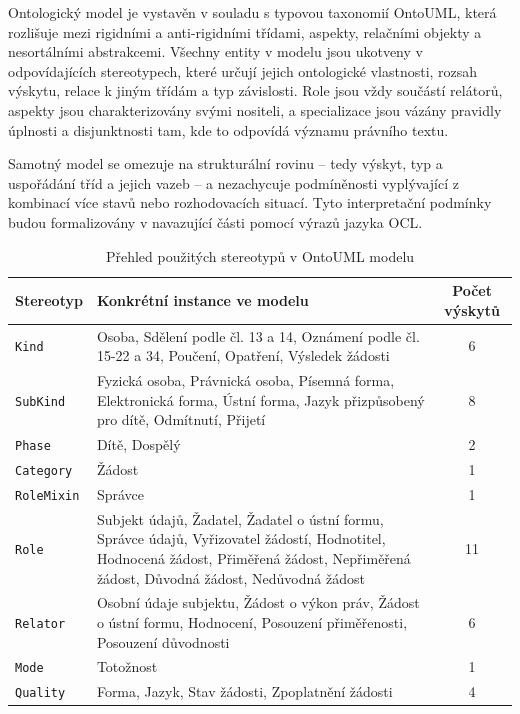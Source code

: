 \noindent Ontologický model je vystavěn v souladu s typovou taxonomií OntoUML, která rozlišuje mezi rigidními a anti-rigidními třídami, aspekty, relačními objekty a nesortálními abstrakcemi. Všechny entity v modelu jsou ukotveny v odpovídajících stereotypech, které určují jejich ontologické vlastnosti, rozsah výskytu, relace k jiným třídám a typ závislosti. Role jsou vždy součástí relátorů, aspekty jsou charakterizovány svými nositeli, a specializace jsou vázány pravidly úplnosti a disjunktnosti tam, kde to odpovídá významu právního textu.

Samotný model se omezuje na strukturální rovinu – tedy výskyt, typ a uspořádání tříd a jejich vazeb – a nezachycuje podmíněnosti vyplývající z kombinací více stavů nebo rozhodovacích situací. Tyto interpretační podmínky budou formalizovány v navazující části pomocí výrazů jazyka OCL.

\begin{table}[H]
  \centering
  \begin{tabular}{|l|p{8cm}|c|}
  \hline
  \textbf{Stereotyp} & \textbf{Konkrétní instance ve modelu} & \textbf{Počet výskytů} \\
  \hline
  \texttt{Kind} & Osoba, Sdělení podle čl. 13 a 14, Oznámení podle čl. 15-22 a 34, Poučení, Opatření, Výsledek žádosti & 6 \\
  \hline
  \texttt{SubKind} & Fyzická osoba, Právnická osoba, Písemná forma, Elektronická forma, Ústní forma, Jazyk přizpůsobený pro dítě, Odmítnutí, Přijetí & 8 \\
  \hline
  \texttt{Phase} & Dítě, Dospělý & 2 \\
  \hline
  \texttt{Category} & Žádost & 1 \\
  \hline
  \texttt{RoleMixin} & Správce & 1 \\
  \hline
  \texttt{Role} & Subjekt údajů, Žadatel, Žadatel o ústní formu, Správce údajů, Vyřizovatel žádostí, Hodnotitel, Hodnocená žádost, Přiměřená žádost, Nepřiměřená žádost, Důvodná žádost, Nedůvodná žádost & 11 \\
  \hline
  \texttt{Relator} & Osobní údaje subjektu, Žádost o výkon práv, Žádost o ústní formu, Hodnocení, Posouzení přiměřenosti, Posouzení důvodnosti & 6 \\
  \hline
  \texttt{Mode} & Totožnost & 1 \\
  \hline
  \texttt{Quality} & Forma, Jazyk, Stav žádosti, Zpoplatnění žádosti & 4 \\
  \hline
  \end{tabular}
  \caption{Přehled použitých stereotypů v OntoUML modelu}
\end{table}

